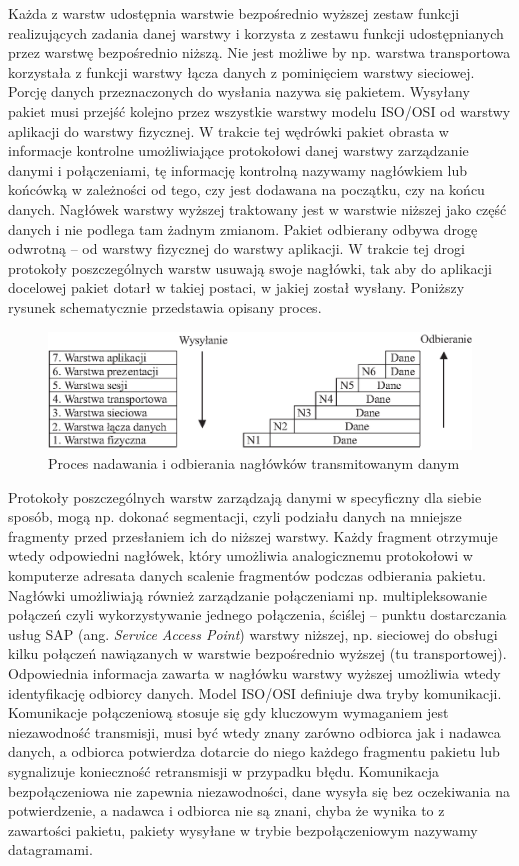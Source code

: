 Każda z warstw udostępnia warstwie bezpośrednio wyższej zestaw funkcji realizujących  zadania danej warstwy i 
korzysta z zestawu funkcji udostępnianych przez warstwę bezpośrednio niższą. Nie jest możliwe by np. warstwa 
transportowa korzystała z funkcji warstwy łącza danych z pominięciem warstwy sieciowej. Porcję danych 
przeznaczonych do wysłania nazywa się pakietem. Wysyłany pakiet musi przejść kolejno przez wszystkie warstwy 
modelu ISO/OSI od warstwy aplikacji do warstwy fizycznej. W trakcie tej wędrówki pakiet obrasta w informacje 
kontrolne umożliwiające protokołowi danej warstwy zarządzanie danymi i połączeniami, tę informację kontrolną 
nazywamy nagłówkiem lub końcówką w zależności od tego, czy jest dodawana na początku, czy na końcu danych. 
Nagłówek warstwy wyższej traktowany jest w warstwie niższej jako część danych i nie podlega tam żadnym zmianom. 
Pakiet odbierany odbywa drogę odwrotną -- od warstwy fizycznej do warstwy aplikacji. W trakcie tej drogi 
protokoły poszczególnych warstw usuwają swoje nagłówki, tak aby do aplikacji docelowej pakiet dotarł w takiej 
postaci, w jakiej został wysłany. Poniższy rysunek schematycznie przedstawia opisany proces.
\begin{figure}[h]
\centering
\includegraphics[width=5in]{./rysunki/nadawanie_i_odbieranie_naglowkow.eps}
\caption{Proces nadawania i odbierania nagłówków transmitowanym danym}
\label{nadawanie}
\end{figure}

Protokoły poszczególnych warstw zarządzają danymi w specyficzny dla siebie sposób, mogą np. dokonać segmentacji, 
czyli podziału danych na mniejsze fragmenty przed przesłaniem ich do niższej warstwy. Każdy fragment otrzymuje 
wtedy odpowiedni nagłówek, który umożliwia analogicznemu protokołowi w komputerze adresata danych scalenie 
fragmentów podczas odbierania pakietu. Nagłówki umożliwiają również zarządzanie połączeniami np. 
multipleksowanie połączeń czyli wykorzystywanie jednego połączenia, ściślej -- punktu dostarczania usług SAP 
(ang. \emph{Service Access Point})  warstwy niższej, np. sieciowej do obsługi kilku połączeń nawiązanych w warstwie 
bezpośrednio wyższej (tu transportowej). Odpowiednia informacja zawarta w nagłówku warstwy wyższej umożliwia 
wtedy identyfikację odbiorcy danych. Model ISO/OSI definiuje dwa tryby komunikacji. Komunikacje połączeniową 
stosuje się gdy kluczowym wymaganiem jest niezawodność transmisji, musi być wtedy znany zarówno odbiorca jak i 
nadawca danych, a odbiorca potwierdza dotarcie do niego każdego fragmentu pakietu lub sygnalizuje konieczność 
retransmisji w przypadku błędu. Komunikacja bezpołączeniowa nie zapewnia niezawodności, dane wysyła się bez 
oczekiwania na potwierdzenie, a nadawca  i odbiorca nie są znani, chyba że wynika to z zawartości pakietu, 
pakiety wysyłane w trybie bezpołączeniowym nazywamy datagramami.


